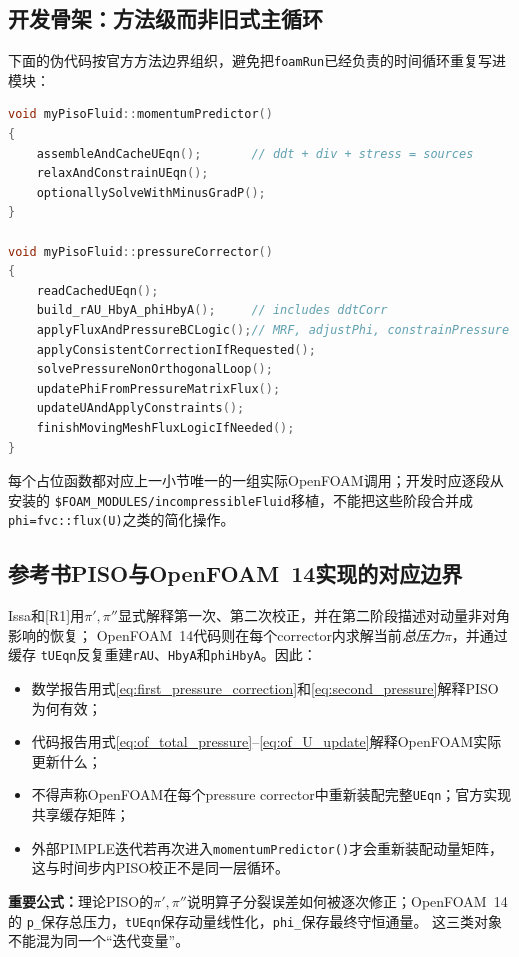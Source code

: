 \documentclass[UTF8,12pt,a4paper]{ctexart}
\numberwithin{equation}{section}
\newcommand{\Rone}{\textnormal{[R1]}}
\newcommand{\keytitle}[1]{\par\smallskip\noindent\colorbox{keybg}{%
  \parbox{0.965\linewidth}{\color{keyblue}\textbf{重要公式：}#1}}\par\smallskip}
\begin{document}
\subsection{开发骨架：方法级而非旧式主循环}
下面的伪代码按官方方法边界组织，避免把\texttt{foamRun}已经负责的时间循环重复写进模块：
\begin{lstlisting}[style=foam,language=C++]
void myPisoFluid::momentumPredictor()
{
    assembleAndCacheUEqn();       // ddt + div + stress = sources
    relaxAndConstrainUEqn();
    optionallySolveWithMinusGradP();
}

void myPisoFluid::pressureCorrector()
{
    readCachedUEqn();
    build_rAU_HbyA_phiHbyA();     // includes ddtCorr
    applyFluxAndPressureBCLogic();// MRF, adjustPhi, constrainPressure
    applyConsistentCorrectionIfRequested();
    solvePressureNonOrthogonalLoop();
    updatePhiFromPressureMatrixFlux();
    updateUAndApplyConstraints();
    finishMovingMeshFluxLogicIfNeeded();
}
\end{lstlisting}
每个占位函数都对应上一小节唯一的一组实际OpenFOAM调用；开发时应逐段从安装的
\texttt{\$FOAM\_MODULES/incompressibleFluid}移植，不能把这些阶段合并成
\texttt{phi=fvc::flux(U)}之类的简化操作。

\subsection{参考书PISO与OpenFOAM~14实现的对应边界}
Issa和\Rone 用$\pi',\pi''$显式解释第一次、第二次校正，并在第二阶段描述对动量非对角影响的恢复；
OpenFOAM~14代码则在每个corrector内求解当前\emph{总压力}$\pi$，并通过缓存
\texttt{tUEqn}反复重建\texttt{rAU}、\texttt{HbyA}和\texttt{phiHbyA}。因此：
\begin{itemize}
  \item 数学报告用式\eqref{eq:first_pressure_correction}和\eqref{eq:second_pressure}解释PISO为何有效；
  \item 代码报告用式\eqref{eq:of_total_pressure}--\eqref{eq:of_U_update}解释OpenFOAM实际更新什么；
  \item 不得声称OpenFOAM在每个pressure corrector中重新装配完整\texttt{UEqn}；官方实现共享缓存矩阵；
  \item 外部PIMPLE迭代若再次进入\texttt{momentumPredictor()}才会重新装配动量矩阵，这与时间步内PISO校正不是同一层循环。
\end{itemize}
\keytitle{理论PISO的$\pi',\pi''$说明算子分裂误差如何被逐次修正；OpenFOAM~14的
\texttt{p\_}保存总压力，\texttt{tUEqn}保存动量线性化，\texttt{phi\_}保存最终守恒通量。
这三类对象不能混为同一个“迭代变量”。}
\end{document}
